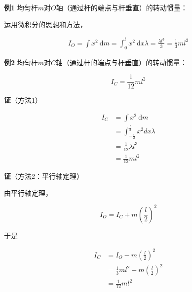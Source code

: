 \documentclass[12pt, a4paper]{article}
\numberwithin{equation}{section}
\newcommand{\rmd}{\mathrm{~d}}
\begin{document}
    \textbf{例1 \quad}均匀杆\(m\)对\(O\)轴（通过杆的端点与杆垂直）的转动惯量：

    运用微积分的思想和方法，

    \begin{align*}
        I_{O} = \int x^2 \rmd m = \int_{0}^{l} x^2 \rmd x \lambda = \frac{\lambda l^3}{3} = \frac{1}{3} m l^2
    \end{align*}
    \vspace{1em}

    \begin{figure}
        \centering
    \end{figure}

    \textbf{例2 \quad}均匀杆\(m\)对\(C\)轴（通过杆的端点与杆垂直）的转动惯量：

    $$
        I_C =\frac{1}{12} m l^2
    $$

    \textbf{证}（方法1）

    $$
        \begin{aligned}
            I_C &=\int x^2 \rmd m \\
            &=\int_{-\frac{l}{2}}^{\frac{l}{2}} x^2 d x \lambda\\
            &=\frac{1}{12} \lambda l^3\\
            &=\frac{1}{12} m l^2
        \end{aligned}
    $$

    \textbf{证}（方法2：平行轴定理）

    由平行轴定理，

    $$
        I_O = I_C + m \left(\frac{l}{2}\right)^2
    $$

    于是

    $$
        \begin{aligned}
            I_C &=I_O - m \left(\frac{l}{2}\right)^2 \\
            &=\frac{1}{3} m l^2 - m \left(\frac{l}{2}\right)^2 \\
            &=\frac{1}{12} m l^2
        \end{aligned}
    $$
\end{document}
